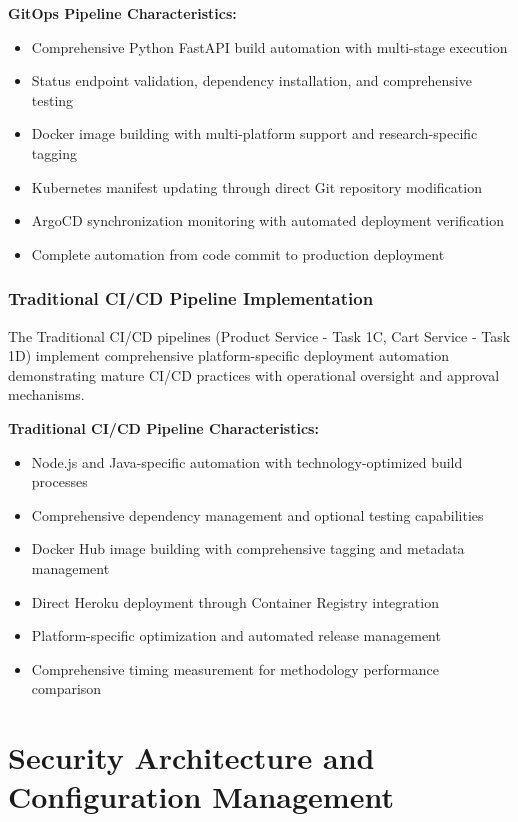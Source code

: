 \textbf{GitOps Pipeline Characteristics:}
\begin{itemize}
\item Comprehensive Python FastAPI build automation with multi-stage execution
\item Status endpoint validation, dependency installation, and comprehensive testing
\item Docker image building with multi-platform support and research-specific tagging
\item Kubernetes manifest updating through direct Git repository modification
\item ArgoCD synchronization monitoring with automated deployment verification
\item Complete automation from code commit to production deployment
\end{itemize}

\subsubsection{Traditional CI/CD Pipeline Implementation}

The Traditional CI/CD pipelines (Product Service - Task 1C, Cart Service - Task 1D) implement comprehensive platform-specific deployment automation demonstrating mature CI/CD practices with operational oversight and approval mechanisms.

\textbf{Traditional CI/CD Pipeline Characteristics:}
\begin{itemize}
\item Node.js and Java-specific automation with technology-optimized build processes
\item Comprehensive dependency management and optional testing capabilities
\item Docker Hub image building with comprehensive tagging and metadata management
\item Direct Heroku deployment through Container Registry integration
\item Platform-specific optimization and automated release management
\item Comprehensive timing measurement for methodology performance comparison
\end{itemize}

\section{Security Architecture and Configuration Management}

